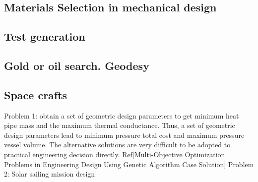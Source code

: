     \subsection{Materials Selection in mechanical design}
    \subsection{Test generation}
    \subsection{Gold or oil search. Geodesy}
    \subsection{Space crafts}
        Problem 1: obtain a set of geometric design parameters to get minimum heat pipe mass and the maximum thermal conductance.
        Thus, a set of geometric design parameters lead to minimum pressure total cost and maximum pressure vessel volume. 
        The alternative solutions are very difficult to be adopted to practical engineering decision directly. 
        Ref[Multi-Objective Optimization Problems in Engineering Design Using Genetic Algorithm Case Solution]
        Problem 2: Solar sailing mission design


